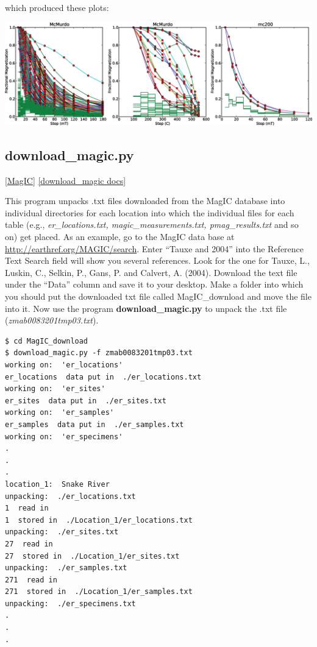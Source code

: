 \documentclass[11pt]{book}
\begin{document}
{{\begin{verbatim}
\end{verbatim}

\noindent which produced these plots:

\includegraphics[width=15cm]{EPSfiles/dmag.eps}


 \subsection{download\_magic.py} [\href{http://earthref.org/MagIC}{MagIC}]
\href{https://github.com/PmagPy/PmagPy/blob/master/programs/download_magic.py}{[download\_magic docs]}

 This program unpacks .txt files downloaded from the MagIC database into individual directories for each location into which the individual files for each table (e.g., {\it er\_locations.txt, magic\_measurements.txt, pmag\_results.txt} and so on) get placed.   As an example, go to the MagIC data base at \url{http://earthref.org/MAGIC/search}.  Enter ``Tauxe and 2004'' into the Reference Text Search field will show you several references.   Look for the one for Tauxe, L., Luskin, C., Selkin, P., Gans, P. and Calvert, A. (2004). \nocite{tauxe04b}  Download the  text file under the ``Data'' column and save it to your desktop.   Make a   folder into which  you should put the downloaded txt file called MagIC\_download and move the file into it.  Now use the program {\bf download\_magic.py} to unpack the .txt file ({\it zmab0083201tmp03.txt}).

 \begin{verbatim}
$ cd MagIC_download
$ download_magic.py -f zmab0083201tmp03.txt
working on:  'er_locations'
er_locations  data put in  ./er_locations.txt
working on:  'er_sites'
er_sites  data put in  ./er_sites.txt
working on:  'er_samples'
er_samples  data put in  ./er_samples.txt
working on:  'er_specimens'
.
.
.
location_1:  Snake River
unpacking:  ./er_locations.txt
1  read in
1  stored in  ./Location_1/er_locations.txt
unpacking:  ./er_sites.txt
27  read in
27  stored in  ./Location_1/er_sites.txt
unpacking:  ./er_samples.txt
271  read in
271  stored in  ./Location_1/er_samples.txt
unpacking:  ./er_specimens.txt
.
.
.
\end{verbatim}

}}
\end{document}
